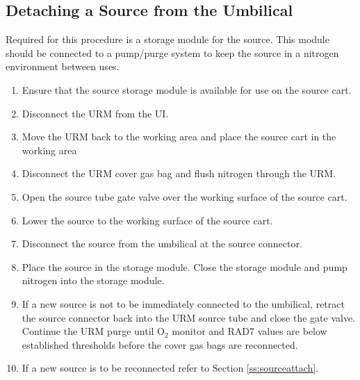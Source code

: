 \subsection{Detaching a Source from the Umbilical}
Required for this procedure is a storage module for the source. This module should be connected to a pump/purge system to keep the source in a nitrogen environment between uses.
\begin{enumerate}
\item Ensure that the source storage module is available for use on the source cart.
\item Disconnect the URM from the UI.
\item Move the URM back to the working area and place the source cart in the working area
\item Disconnect the URM cover gas bag and flush nitrogen through the URM.
\item Open the source tube gate valve over the working surface of the source cart.
\item Lower the source to the working surface of the source cart.
\item Disconnect the source from the umbilical at the source connector.
\item Place the source in the storage module. Close the storage module and pump nitrogen into the storage module.
\item If a new source is not to be immediately connected to the umbilical, retract the source connector back into the URM source tube and close the gate valve. Continue the URM purge until O$_{2}$ monitor and RAD7 values are below established thresholds before the cover gas bags are reconnected. 
\item If a new source is to be reconnected refer to Section \ref{ss:sourceattach}.
\end{enumerate}




